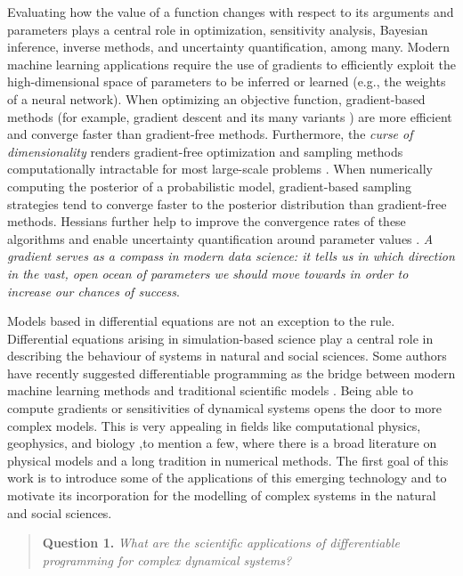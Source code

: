 Evaluating how the value of a function changes with respect to its arguments and parameters plays a central role in optimization, sensitivity analysis, Bayesian inference, inverse methods, and uncertainty quantification, among many\cite{Razavi.2021}. 
Modern machine learning applications require the use of gradients to efficiently exploit the high-dimensional space of parameters to be inferred or learned (e.g., the weights of a neural network). 
When optimizing an objective function, gradient-based methods (for example, gradient descent and its many variants \cite{ruder2016overview-gradient-descent}) are more efficient and converge faster than gradient-free methods.
Furthermore, the \textit{curse of dimensionality} renders gradient-free optimization and sampling methods computationally intractable for most large-scale problems \cite{Oden:2010tv}.
When numerically computing the posterior of a probabilistic model, gradient-based sampling strategies tend to converge faster to the posterior distribution than gradient-free methods. 
Hessians further help to improve the convergence rates of these algorithms and enable uncertainty quantification around parameter values \cite{BuiThanh:2012ul}.
\textit{A gradient serves as a compass in modern data science: it tells us in which direction in the vast, open ocean of parameters we should move towards in order to increase our chances of success}.  

Models based in differential equations are not an exception to the rule\cite{Ghattas.2021}.
Differential equations arising in simulation-based science play a central role in describing the behaviour of systems in natural and social sciences. 
Some authors have recently suggested differentiable programming as the bridge between modern machine learning methods and traditional scientific models \cite{Ramsundar_Krishnamurthy_Viswanathan_2021, Shen_diff_modelling, Gelbrecht-differential-programming-Earth}. 
Being able to compute gradients or sensitivities of dynamical systems opens the door to more complex models.
This is very appealing in fields like computational physics, geophysics, and biology ,to mention a few, where there is a broad literature on physical models and a long tradition in numerical methods. 
The first goal of this work is to introduce some of the applications of this emerging technology and to motivate its incorporation for the modelling of complex systems in the natural and social sciences. 
\begin{quote}
    \textbf{Question 1. }
    \textit{What are the scientific applications of differentiable programming for complex dynamical systems?}
\end{quote}

